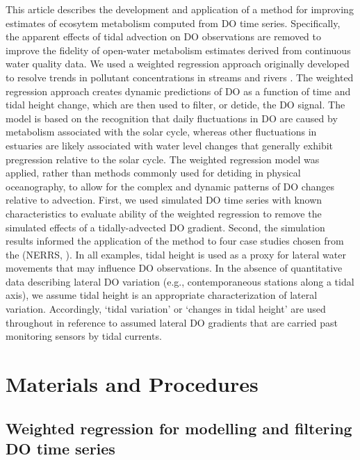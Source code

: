 \documentclass[letterpaper,12pt,oneside]{article}\usepackage[]{graphicx}\usepackage[]{color}
\begin{document}
This article describes the development and application of a method for improving estimates of ecosytem metabolism computed from \ac{DO} time series.  Specifically, the apparent effects of tidal advection on \ac{DO} observations are removed to improve the fidelity of open-water metabolism estimates derived from continuous water quality data.  We used a weighted regression approach originally developed to resolve trends in pollutant concentrations in streams and rivers \citep{Hirsch10}.  The weighted regression approach creates dynamic predictions of \ac{DO} as a function of time and tidal height change, which are then used to filter, or detide, the \ac{DO} signal.  The model is based on the recognition that daily fluctuations in \ac{DO} are caused by metabolism associated with the solar cycle, whereas other fluctuations in estuaries are likely associated with water level changes that generally exhibit pregression relative to the solar cycle.  The weighted regression model was applied, rather than methods commonly used for detiding in physical oceanography, to allow for the complex and dynamic patterns of \ac{DO} changes relative to advection.  First, we used simulated \ac{DO} time series with known characteristics to evaluate ability of the weighted regression to remove the simulated effects of a tidally-advected \ac{DO} gradient.  Second, the simulation results informed the application of the method to four case studies chosen from the  (\acs{NERRS}, \citealt{Wenner04}).  In all examples, tidal height is used as a proxy for lateral water movements that may influence \ac{DO} observations.  In the absence of quantitative data describing lateral \ac{DO} variation (e.g., contemporaneous stations along a tidal axis), we assume tidal height is an appropriate characterization of lateral variation.  Accordingly, `tidal variation' or `changes in tidal height' are used throughout in reference to assumed lateral \ac{DO} gradients that are carried past monitoring sensors by tidal currents.

\section{Materials and Procedures}

\subsection{Weighted regression for modelling and filtering \ac{DO} time series}
\end{document}
